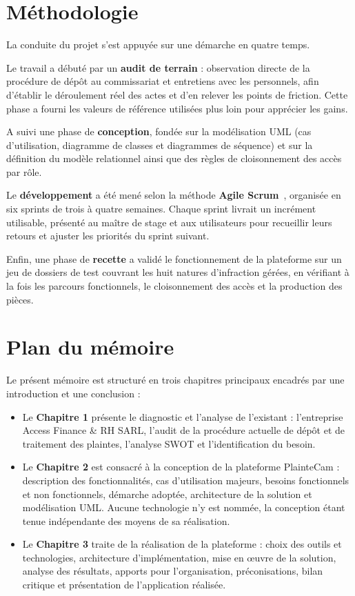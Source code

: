\section*{Méthodologie}

La conduite du projet s'est appuyée sur une démarche en quatre temps.

Le travail a débuté par un \textbf{audit de terrain} : observation directe de la procédure de dépôt au commissariat et entretiens avec les personnels, afin d'établir le déroulement réel des actes et d'en relever les points de friction. Cette phase a fourni les valeurs de référence utilisées plus loin pour apprécier les gains.

A suivi une phase de \textbf{conception}, fondée sur la modélisation UML (cas d'utilisation, diagramme de classes et diagrammes de séquence) et sur la définition du modèle relationnel ainsi que des règles de cloisonnement des accès par rôle.

Le \textbf{développement} a été mené selon la méthode \textbf{Agile Scrum}~\cite{agile-manifesto}, organisée en six sprints de trois à quatre semaines. Chaque sprint livrait un incrément utilisable, présenté au maître de stage et aux utilisateurs pour recueillir leurs retours et ajuster les priorités du sprint suivant.

Enfin, une phase de \textbf{recette} a validé le fonctionnement de la plateforme sur un jeu de dossiers de test couvrant les huit natures d'infraction gérées, en vérifiant à la fois les parcours fonctionnels, le cloisonnement des accès et la production des pièces.

\section*{Plan du mémoire}

Le présent mémoire est structuré en trois chapitres principaux encadrés par une introduction et une conclusion :

\begin{itemize}
    \item Le \textbf{Chapitre 1} présente le diagnostic et l'analyse de l'existant : l'entreprise Access Finance \& RH SARL, l'audit de la procédure actuelle de dépôt et de traitement des plaintes, l'analyse SWOT et l'identification du besoin.
    \item Le \textbf{Chapitre 2} est consacré à la conception de la plateforme PlainteCam : description des fonctionnalités, cas d'utilisation majeurs, besoins fonctionnels et non fonctionnels, démarche adoptée, architecture de la solution et modélisation UML. Aucune technologie n'y est nommée, la conception étant tenue indépendante des moyens de sa réalisation.
    \item Le \textbf{Chapitre 3} traite de la réalisation de la plateforme : choix des outils et technologies, architecture d'implémentation, mise en œuvre de la solution, analyse des résultats, apports pour l'organisation, préconisations, bilan critique et présentation de l'application réalisée.
\end{itemize}
